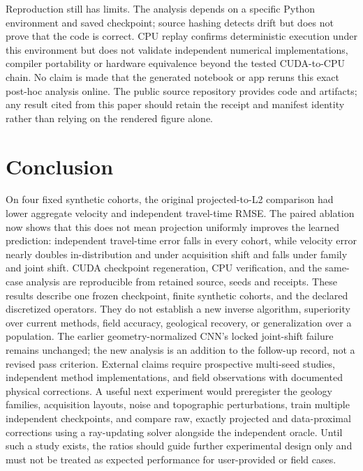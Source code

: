 \documentclass[11pt]{article}
\newcounter{algorithm}
\begin{document}
Reproduction still has limits. The analysis depends on a specific Python environment and saved checkpoint; source hashing detects drift but does not prove that the code is correct. CPU replay confirms deterministic execution under this environment but does not validate independent numerical implementations, compiler portability or hardware equivalence beyond the tested CUDA-to-CPU chain. No claim is made that the generated notebook or app reruns this exact post-hoc analysis online. The public source repository provides code and artifacts; any result cited from this paper should retain the receipt and manifest identity rather than relying on the rendered figure alone.

\section{Conclusion}
On four fixed synthetic cohorts, the original projected-to-L2 comparison had lower aggregate velocity and independent travel-time RMSE. The paired ablation now shows that this does not mean projection uniformly improves the learned prediction: independent travel-time error falls in every cohort, while velocity error nearly doubles in-distribution and under acquisition shift and falls under family and joint shift. CUDA checkpoint regeneration, CPU verification, and the same-case analysis are reproducible from retained source, seeds and receipts. These results describe one frozen checkpoint, finite synthetic cohorts, and the declared discretized operators. They do not establish a new inverse algorithm, superiority over current methods, field accuracy, geological recovery, or generalization over a population. The earlier geometry-normalized CNN's locked joint-shift failure remains unchanged; the new analysis is an addition to the follow-up record, not a revised pass criterion. External claims require prospective multi-seed studies, independent method implementations, and field observations with documented physical corrections. A useful next experiment would preregister the geology families, acquisition layouts, noise and topographic perturbations, train multiple independent checkpoints, and compare raw, exactly projected and data-proximal corrections using a ray-updating solver alongside the independent oracle. Until such a study exists, the ratios should guide further experimental design only and must not be treated as expected performance for user-provided or field cases.
\end{document}
